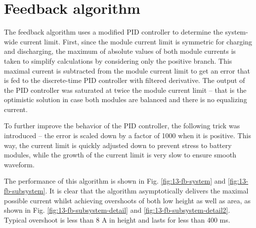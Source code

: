 \section{Feedback algorithm}

The feedback algorithm uses a modified PID controller to determine the system-wide current limit. First, since the module current limit is symmetric for charging and discharging, the maximum of absolute values of both module currents is taken to simplify calculations by considering only the positive branch. This maximal current is subtracted from the module current limit to get an error that is fed to the discrete-time PID controller with filtered derivative. The output of the PID controller was saturated at twice the module current limit -- that is the optimistic solution in case both modules are balanced and there is no equalizing current.

To further improve the behavior of the PID controller, the following trick was introduced -- the error is scaled down by a factor of 1000 when it is positive. This way, the current limit is quickly adjusted down to prevent stress to battery modules, while the growth of the current limit is very slow to ensure smooth waveform.

The performance of this algorithm is shown in Fig. \ref{fig:13-fb-system} and \ref{fig:13-fb-subsystem}. It is clear that the algorithm asymptotically delivers the maximal possible current whilst achieving overshoots of both low height as well as area, as shown in Fig. \ref{fig:13-fb-subsystem-detail} and \ref{fig:13-fb-subsystem-detail2}. Typical overshoot is less than 8 A in height and lasts for less than 400 ms.

